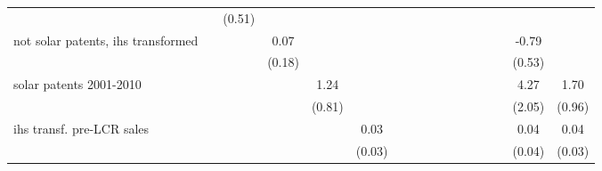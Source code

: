 \begin{table}[htbp]
\begin{tabular*}{0.8\hsize}{@{\hskip\tabcolsep\extracolsep\fill}l*{16}{c}}
                    &                     &      (0.51)         &                     &                     &                     &                     &                     &                     &                     &                     &                     &                     &                     &                     &                     &                     \\
[1em]
not solar patents, ihs transformed&                     &                     &        0.07         &                     &                     &                     &                     &                     &                     &                     &                     &                     &                     &                     &       -0.79         &                     \\
                    &                     &                     &      (0.18)         &                     &                     &                     &                     &                     &                     &                     &                     &                     &                     &                     &      (0.53)         &                     \\
[1em]
solar patents 2001-2010&                     &                     &                     &        1.24         &                     &                     &                     &                     &                     &                     &                     &                     &                     &                     &        4.27\sym{**} &        1.70\sym{*}  \\
                    &                     &                     &                     &      (0.81)         &                     &                     &                     &                     &                     &                     &                     &                     &                     &                     &      (2.05)         &      (0.96)         \\
[1em]
ihs transf. pre-LCR sales&                     &                     &                     &                     &        0.03         &                     &                     &                     &                     &                     &                     &                     &                     &                     &        0.04         &        0.04         \\
                    &                     &                     &                     &                     &      (0.03)         &                     &                     &                     &                     &                     &                     &                     &                     &                     &      (0.04)         &      (0.03)         \\

\end{tabular*}
\end{table}
